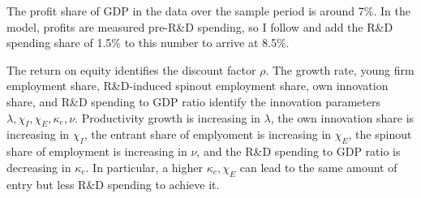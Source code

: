 \documentclass[12pt,english]{article}
\theoremstyle{remark}
\begin{document}
The profit share of GDP in the data over the sample period is around 7\%. In the model, profits are measured pre-R\&D spending, so I follow \cite{akcigit_growth_2018} and add the R\&D spending share of 1.5\% to this number to arrive at 8.5\%. 

The return on equity identifies the discount factor $\rho$. The growth rate, young firm employment share, R\&D-induced spinout employment share, own innovation share, and R\&D spending to GDP ratio identify the innovation parameters $\lambda, \chi_I, \chi_E, \kappa_e, \nu$. Productivity growth is increasing in $\lambda$, the own innovation share is increasing in $\chi_I$, the entrant share of emplyoment is increasing in $\chi_E$, the spinout share of employment is increasing in $\nu$, and the R\&D spending to GDP ratio is decreasing in $\kappa_e$. In particular, a higher $\kappa_e, \chi_E$ can lead to the same amount of entry but less R\&D spending to achieve it.
\end{document}
